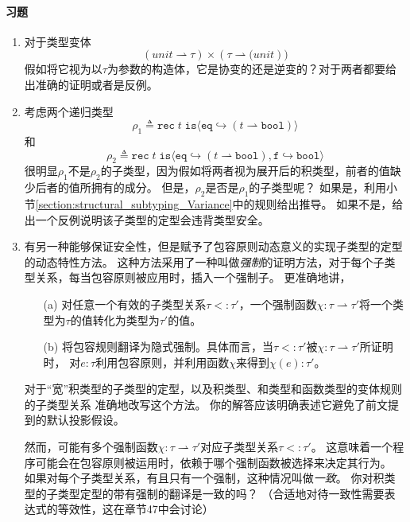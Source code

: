 \paragraph{习题}
\begin{enumerate}
    \item 对于类型变体
    $$
        (unit \rightharpoonup \tau)\times(\tau\rightharpoonup\texttt(unit))
    $$
    假如将它视为以$\tau$为参数的构造体，它是协变的还是逆变的？对于两者都要给出准确的证明或者是反例。
    \item 考虑两个递归类型
    $$
        \rho_1\triangleq \texttt{rec}\;t\;\texttt{is}\langle\texttt{eq}\hookrightarrow(t\rightharpoonup\texttt{bool})\rangle
    $$
    和
    $$
        \rho_2\triangleq \texttt{rec}\;t\;\texttt{is}\langle\texttt{eq}\hookrightarrow(t\rightharpoonup\texttt{bool}),\texttt{f}\hookrightarrow\texttt{bool}\rangle
    $$
    很明显$\rho_1$不是$\rho_2$的子类型，因为假如将两者视为展开后的积类型，前者的值缺少后者的值所拥有的成分。
    但是，$\rho_2$是否是$\rho_1$的子类型呢？
    如果是，利用小节\ref{section:structural_subtyping_Variance}中的规则给出推导。
    如果不是，给出一个反例说明该子类型的定型会违背类型安全。
    \item 有另一种能够保证安全性，但是赋予了包容原则动态意义的实现子类型的定型的动态特性方法。
    这种方法采用了一种叫做\textit{强制}的证明方法，对于每个子类型关系，每当包容原则被应用时，插入一个强制子。
    更准确地讲，
    \begin{itemize}
        \item[(a)]对任意一个有效的子类型关系$\tau<:\tau'$，一个强制函数$\chi:\tau\rightharpoonup\tau'$将一个类型为$\tau$的值转化为类型为$\tau'$的值。
        \item[(b)]将包容规则翻译为隐式强制。具体而言，当$\tau<:\tau'$被$\chi:\tau\rightharpoonup\tau'$所证明时，
        对$e:\tau$利用包容原则，并利用函数$\chi$来得到$\chi(e):\tau'$。
    \end{itemize}
    对于“宽”积类型的子类型的定型，以及积类型、和类型和函数类型的变体规则的子类型关系
    准确地改写这个方法。
    你的解答应该明确表述它避免了前文提到的默认投影假设。

    然而，可能有多个强制函数$\chi:\tau\rightharpoonup\tau'$对应子类型关系$\tau<:\tau'$。
    这意味着一个程序可能会在包容原则被运用时，依赖于哪个强制函数被选择来决定其行为。
    如果对每个子类型关系，有且只有一个强制，这种情况叫做\textit{一致}。
    你对积类型的子类型定型的带有强制的翻译是一致的吗？
    （合适地对待一致性需要表达式的等效性，这在章节47中会讨论）
\end{enumerate}
